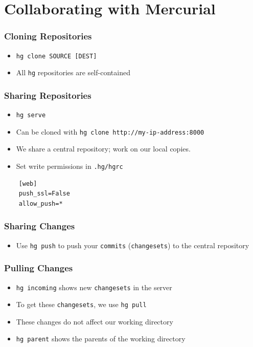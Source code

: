 \documentclass[14pt,compress]{beamer}
\newcommand{\typ}[1]{\lstinline{#1}}
\begin{document}
\section{Collaborating with Mercurial}
\begin{frame}[fragile]
  \frametitle{Cloning Repositories}
  \begin{itemize}
  \item \typ{hg clone SOURCE [DEST]}
  \item All \typ{hg} repositories are self-contained
  \end{itemize}
\end{frame}

\begin{frame}[fragile]
  \frametitle{Sharing Repositories}
  \begin{itemize}
  \item \typ{hg serve}
  \item Can be cloned with \typ{hg clone http://my-ip-address:8000}
  \item We share a central repository; work on our local copies. 
  \item Set write permissions in \typ{.hg/hgrc}
  \end{itemize}
  \begin{lstlisting}
    [web]
    push_ssl=False
    allow_push=*
  \end{lstlisting}
\end{frame}

\begin{frame}
  \frametitle{Sharing Changes}
  \begin{itemize}
  \item Use \typ{hg push} to push your \typ{commits}
    (\typ{changesets}) to the central repository
  \end{itemize}
\end{frame}


\begin{frame}
  \frametitle{Pulling Changes}
  \begin{itemize}
  \item \typ{hg incoming} shows new \typ{changesets} in the server 
  \item To get these \typ{changesets}, we use \typ{hg pull}
  \item These changes do not affect our working directory
  \item \typ{hg parent} shows the parents of the working directory
  \end{itemize}
\end{frame}
\end{document}
